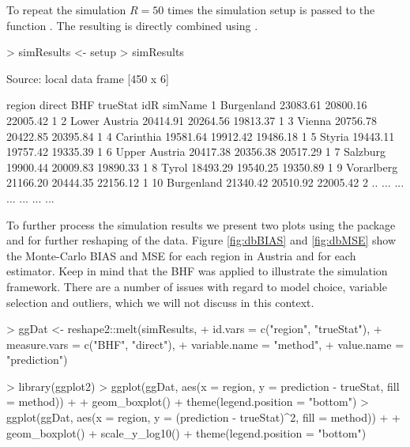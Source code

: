 \documentclass[article]{ajs}
\begin{document}
To repeat the simulation $R = 50$ times the simulation setup is passed to the function . The resulting  is directly combined using .

\begin{Schunk}
\begin{Sinput}
> simResults <- setup %
> simResults
\end{Sinput}
\begin{Soutput}
Source: local data frame [450 x 6]

          region   direct      BHF trueStat idR simName
1     Burgenland 23083.61 20800.16 22005.42   1        
2  Lower Austria 20414.91 20264.56 19813.37   1        
3         Vienna 20756.78 20422.85 20395.84   1        
4      Carinthia 19581.64 19912.42 19486.18   1        
5         Styria 19443.11 19757.42 19335.39   1        
6  Upper Austria 20417.38 20356.38 20517.29   1        
7       Salzburg 19900.44 20009.83 19890.33   1        
8          Tyrol 18493.29 19540.25 19350.89   1        
9     Vorarlberg 21166.20 20444.35 22156.12   1        
10    Burgenland 21340.42 20510.92 22005.42   2        
..           ...      ...      ...      ... ...     ...
\end{Soutput}
\end{Schunk}

To further process the simulation results we present two plots using the package  \citep{wickham09} and  \citep{wickham07} for further reshaping of the data. Figure \ref{fig:dbBIAS} and \ref{fig:dbMSE} show the Monte-Carlo BIAS and MSE for each region in Austria and for each estimator. Keep in mind that the BHF was applied to illustrate the simulation framework. There are a number of issues with regard to model choice, variable selection and outliers, which we will not discuss in this context.

\begin{Schunk}
\begin{Sinput}
> ggDat <- reshape2::melt(simResults,
+               id.vars = c("region", "trueStat"), 
+               measure.vars = c("BHF", "direct"), 
+               variable.name = "method",
+               value.name = "prediction")
\end{Sinput}
\end{Schunk}

\begin{Schunk}
\begin{Sinput}
> library(ggplot2)
> ggplot(ggDat, aes(x = region, y = prediction - trueStat, fill = method)) + 
+   geom_boxplot() + theme(legend.position = "bottom")
> ggplot(ggDat, aes(x = region, y = (prediction - trueStat)^2, fill = method)) + 
+   geom_boxplot() + scale_y_log10() + theme(legend.position = "bottom")
\end{Sinput}
\end{Schunk}
\end{document}
